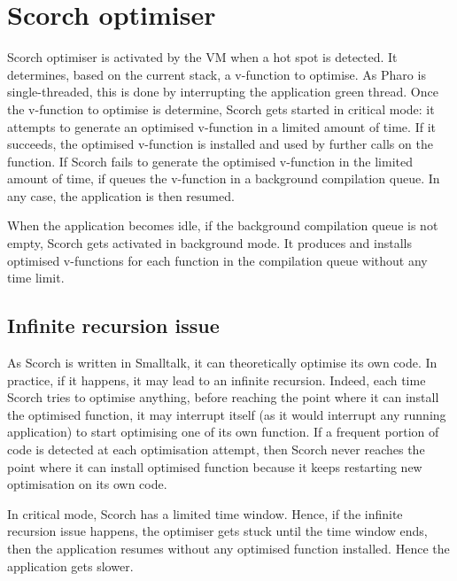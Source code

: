 \documentclass[a4paper,12pt,twoside]{../includes/ThesisStyle}
\begin{document}

\section{Scorch optimiser}

Scorch optimiser is activated by the VM when a hot spot is detected. It determines, based on the current stack, a v-function to optimise. As Pharo is single-threaded, this is done by interrupting the application green thread. Once the v-function to optimise is determine, Scorch gets started in critical mode: it attempts to generate an optimised v-function in a limited amount of time. If it succeeds, the optimised v-function is installed and used by further calls on the function. If Scorch fails to generate the optimised v-function in the limited amount of time, if queues the v-function in a background compilation queue. In any case, the application is then resumed.

When the application becomes idle, if the background compilation queue is not empty, Scorch gets activated in background mode. It produces and installs optimised v-functions for each function in the compilation queue without any time limit. 

\subsection{Infinite recursion issue}

As Scorch is written in Smalltalk, it can theoretically optimise its own code. In practice, if it happens, it may lead to an infinite recursion. Indeed, each time Scorch tries to optimise anything, before reaching the point where it can install the optimised function, it may interrupt itself (as it would interrupt any running application) to start optimising one of its own function. If a frequent portion of code is detected at each optimisation attempt, then Scorch never reaches the point where it can install optimised function because it keeps restarting new optimisation on its own code.

In critical mode, Scorch has a limited time window. Hence, if the infinite recursion issue happens, the optimiser gets stuck until the time window ends, then the application resumes without any optimised function installed. Hence the application gets slower.
\end{document}
